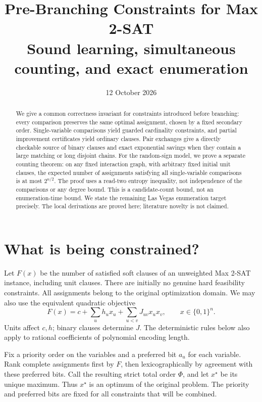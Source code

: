 \documentclass[11pt,a4paper]{article}
\title{Pre-Branching Constraints for Max 2-SAT\\
\large Sound learning, simultaneous counting, and exact enumeration}
\author{}
\date{12 October 2026}
\theoremstyle{remark}
\begin{document}
\maketitle

\begin{abstract}
We give a common correctness invariant for constraints introduced before
branching: every comparison preserves the same optimal assignment, chosen
by a fixed secondary order. Single-variable comparisons yield guarded
cardinality constraints, and partial improvement certificates yield
ordinary clauses. Pair exchanges give a directly checkable source of
binary clauses and exact exponential savings when they contain a large
matching or long disjoint chains. For the random-sign model, we prove a
separate counting theorem: on any fixed interaction graph, with arbitrary
fixed initial unit clauses, the expected number of assignments satisfying
all single-variable comparisons is at most $2^{n/2}$. The proof uses a
read-two entropy inequality, not independence of the comparisons or any
degree bound. This is a candidate-count bound, not an enumeration-time
bound. We state the remaining Las Vegas enumeration target precisely.
The local derivations are proved here; literature novelty is not claimed.
\end{abstract}

\section{What is being constrained?}

Let $F(x)$ be the number of satisfied soft clauses of an unweighted
Max 2-SAT instance, including unit clauses. There are initially no genuine
hard feasibility constraints. All assignments belong to the original
optimization domain. We may also use the equivalent quadratic objective
\begin{equation}
 F(x)=c+\sum_u h_ux_u+\sum_{u<v}J_{uv}x_ux_v,
 \qquad x\in\{0,1\}^n.                         \label{eq:quadratic}
\end{equation}
Units affect $c,h$; binary clauses determine $J$. The deterministic rules
below also apply to rational coefficients of polynomial encoding length.

Fix a priority order on the variables and a preferred bit $a_u$ for each
variable. Rank complete assignments first by $F$, then lexicographically
by agreement with these preferred bits. Call the resulting strict total
order $\Phi$, and let $x^\star$ be its unique maximum. Thus $x^\star$ is
an optimum of the original problem. The priority and preferred bits are
fixed for all constraints that will be combined.
\end{document}
